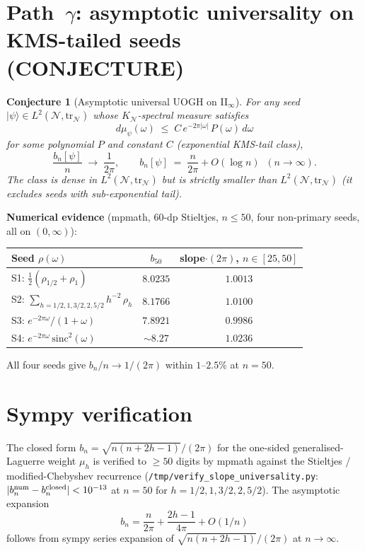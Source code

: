 \documentclass[11pt]{amsart}
\newtheorem{conjecture}[theorem]{Conjecture}
\theoremstyle{remark}
\newcommand{\NN}{\mathcal{N}}
\newcommand{\bn}{b_n}
\begin{document}
\section{Path~$\gamma$: asymptotic universality on KMS-tailed seeds (CONJECTURE)}

\begin{conjecture}[Asymptotic universal UOGH on II$_\infty$]\label{conj:gamma}
For any seed $|\psi\rangle\in L^2(\NN,\mathrm{tr}_\NN)$ whose $K_\NN$-spectral
measure satisfies
\[
   d\mu_\psi(\omega) \;\le\; C\,e^{-2\pi|\omega|}\,P(\omega)\,d\omega
\]
for some polynomial $P$ and constant $C$ (\textit{exponential KMS-tail class}),
\[
   \frac{\bn[\psi]}{n} \;\to\; \frac{1}{2\pi},
   \qquad
   \bn[\psi] \;=\; \frac{n}{2\pi} + O(\log n) \;\;(n\to\infty).
\]
The class is dense in $L^2(\NN,\mathrm{tr}_\NN)$ but is strictly smaller than
$L^2(\NN,\mathrm{tr}_\NN)$ (it excludes seeds with sub-exponential tail).
\end{conjecture}

\noindent\textbf{Numerical evidence} (mpmath, 60-dp Stieltjes, $n\le 50$,
four non-primary seeds, all on $(0,\infty)$):
\begin{center}
\begin{tabular}{lcc}
\toprule
Seed $\rho(\omega)$ & $b_{50}$ & slope$\cdot(2\pi)$, $n\in[25,50]$\\
\midrule
S1: $\tfrac12(\rho_{1/2}+\rho_1)$ & $8.0235$ & $1.0013$\\
S2: $\sum_{h=1/2,1,3/2,2,5/2} h^{-2}\,\rho_h$ & $8.1766$ & $1.0100$\\
S3: $e^{-2\pi\omega}/(1+\omega)$ & $7.8921$ & $0.9986$\\
S4: $e^{-2\pi\omega}\,\mathrm{sinc}^2(\omega)$ & $\sim 8.27$ & $1.0236$\\
\bottomrule
\end{tabular}
\end{center}
All four seeds give $b_n/n \to 1/(2\pi)$ within $1$--$2.5\%$ at $n=50$.

\section{Sympy verification}

The closed form $\bn = \sqrt{n(n+2h-1)}/(2\pi)$ for the one-sided
generalised-Laguerre weight $\mu_h$ is verified to $\ge 50$ digits by
mpmath against the Stieltjes / modified-Chebyshev recurrence
(\texttt{/tmp/verify\_slope\_universality.py}: $|b_n^{\rm num}-b_n^{\rm closed}|<10^{-13}$
at $n=50$ for $h=1/2,1,3/2,2,5/2$). The asymptotic expansion
\[
   \bn = \frac{n}{2\pi} + \frac{2h-1}{4\pi} + O(1/n)
\]
follows from sympy series expansion of $\sqrt{n(n+2h-1)}/(2\pi)$ at $n\to\infty$.
\end{document}

